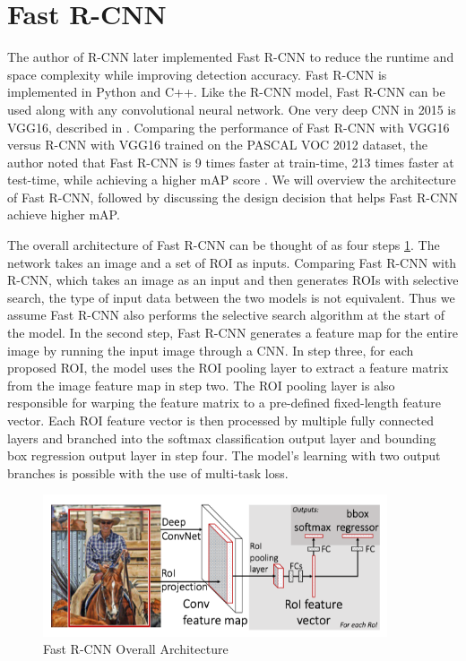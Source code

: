 \section{Fast R-CNN}

The author of R-CNN later implemented Fast R-CNN to reduce the runtime and space complexity while improving detection accuracy. Fast R-CNN is implemented in Python and C++. Like the R-CNN model, Fast R-CNN can be used along with any convolutional neural network. One very deep CNN in 2015 is VGG16, described in \cite{vgg16_2014}. Comparing the performance of Fast R-CNN with VGG16 versus R-CNN with VGG16 trained on the PASCAL VOC 2012 dataset, the author noted that Fast R-CNN is 9 times faster at train-time, 213 times faster at test-time, while achieving a higher mAP score \cite{fast_rcnn_og}. We will overview the architecture of Fast R-CNN, followed by discussing the design decision that helps Fast R-CNN achieve higher mAP.

The overall architecture of Fast R-CNN can be thought of as four steps \ref{fig:fast_rcnn_archite}. The network takes an image and a set of ROI as inputs. Comparing Fast R-CNN with R-CNN, which takes an image as an input and then generates ROIs with selective search, the type of input data between the two models is not equivalent. Thus we assume Fast R-CNN also performs the selective search algorithm at the start of the model. In the second step, Fast R-CNN generates a feature map for the entire image by running the input image through a CNN. In step three, for each proposed ROI, the model uses the ROI pooling layer to extract a feature matrix from the image feature map in step two. The ROI pooling layer is also responsible for warping the feature matrix to a pre-defined fixed-length feature vector. Each ROI feature vector is then processed by multiple fully connected layers and branched into the softmax classification output layer and bounding box regression output layer in step four. The model's learning with two output branches is possible with the use of multi-task loss.

\begin{figure}[!ht]
    \centering
    \includegraphics[width=4in]{figures/fast_rcnn_archiet.png}
    \caption{Fast R-CNN Overall Architecture \cite{fast_rcnn_og}} \label{fig:fast_rcnn_archite}
\end{figure}


